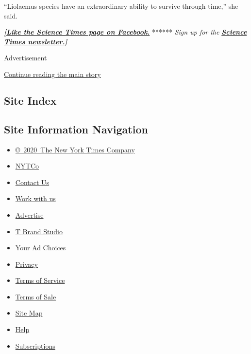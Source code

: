 ``Liolaemus species have an extraordinary ability to survive through
time,'' she said.

\textbf{\emph{{[}}\href{http://on.fb.me/1paTQ1h}{\emph{Like the Science
Times page on Facebook.}}} ****** \emph{\textbar{} Sign up for the}
\textbf{\href{http://nyti.ms/1MbHaRU}{\emph{Science Times
newsletter.}}\emph{{]}}}

Advertisement

\protect\hyperlink{after-bottom}{Continue reading the main story}

\hypertarget{site-index}{%
\subsection{Site Index}\label{site-index}}

\hypertarget{site-information-navigation}{%
\subsection{Site Information
Navigation}\label{site-information-navigation}}

\begin{itemize}
\tightlist
\item
  \href{https://help.nytimes.com/hc/en-us/articles/115014792127-Copyright-notice}{©~2020~The
  New York Times Company}
\end{itemize}

\begin{itemize}
\tightlist
\item
  \href{https://www.nytco.com/}{NYTCo}
\item
  \href{https://help.nytimes.com/hc/en-us/articles/115015385887-Contact-Us}{Contact
  Us}
\item
  \href{https://www.nytco.com/careers/}{Work with us}
\item
  \href{https://nytmediakit.com/}{Advertise}
\item
  \href{http://www.tbrandstudio.com/}{T Brand Studio}
\item
  \href{https://www.nytimes.com/privacy/cookie-policy\#how-do-i-manage-trackers}{Your
  Ad Choices}
\item
  \href{https://www.nytimes.com/privacy}{Privacy}
\item
  \href{https://help.nytimes.com/hc/en-us/articles/115014893428-Terms-of-service}{Terms
  of Service}
\item
  \href{https://help.nytimes.com/hc/en-us/articles/115014893968-Terms-of-sale}{Terms
  of Sale}
\item
  \href{https://spiderbites.nytimes.com}{Site Map}
\item
  \href{https://help.nytimes.com/hc/en-us}{Help}
\item
  \href{https://www.nytimes.com/subscription?campaignId=37WXW}{Subscriptions}
\end{itemize}
